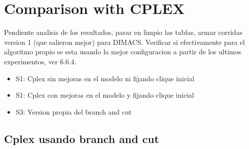 \section{Comparison with CPLEX}

Pendiente analisis de los resultados, pasar en limpio las tablas, armar corridas version 1 (que salieron mejor) para DIMACS. Verificar si efectivamente para el algoritmo propio se esta usando la mejor configuracion a partir de los ultimos experimentos, ver 6.6.4.

\begin{itemize}

\item S1: Cplex sin mejoras en el modelo ni fijando clique inicial
\item S1: Cplex con mejoras en el modelo y fijando clique inicial
\item S3: Version propia del branch and cut

\end{itemize}

\clearpage

\subsection{Cplex usando branch and cut}

